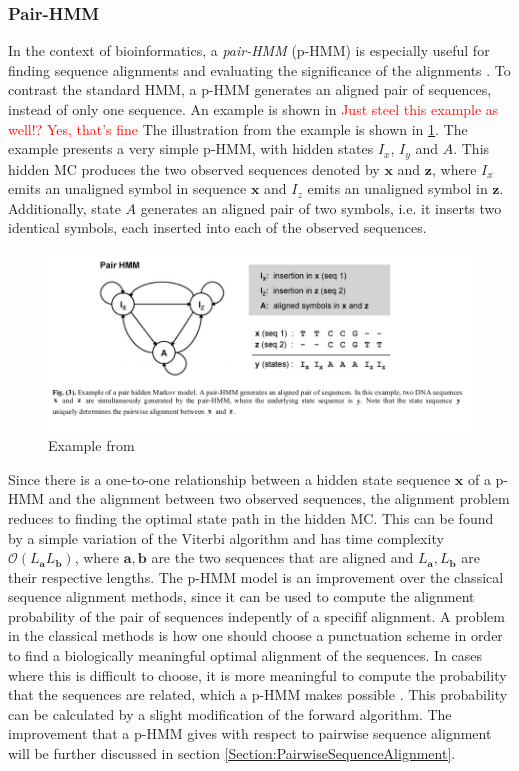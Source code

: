 \documentclass{article}\usepackage[]{graphicx}\usepackage[]{color}
\begin{document}
\subsubsection{Pair-HMM}
In the context of bioinformatics, a \textit{pair-HMM} (p-HMM) is especially useful for finding sequence alignments and evaluating the significance of the alignments \cite{Yoon2009}. To contrast the standard HMM, a p-HMM generates an aligned pair of sequences, instead of only one sequence. An example is shown in \cite{Yoon2009} \textcolor{red}{Just steel this example as well!? Yes, that's fine} The illustration from the example is shown in \ref{fig:Yoon2009PairHMMExample}. The example presents a very simple p-HMM, with hidden states $I_x$, $I_y$ and $A$. This hidden MC produces the two observed sequences denoted by $\mathbf{x}$ and $\mathbf{z}$, where $I_x$ emits an unaligned symbol in sequence $\mathbf{x}$ and $I_z$ emits an unaligned symbol in $\mathbf{z}$. Additionally, state $A$ generates an aligned pair of two symbols, i.e. it inserts two identical symbols, each inserted into each of the observed sequences.  

\begin{figure}
    \centering
    \includegraphics[width = \textwidth]{examplePairHMMYoon.png}
    \caption{Example from \cite{Yoon2009}}
    \label{fig:Yoon2009PairHMMExample}
\end{figure}

Since there is a one-to-one relationship between a hidden state sequence $\mathbf{x}$ of a p-HMM and the alignment between two observed sequences, the alignment problem reduces to finding the optimal state path in the hidden MC. This can be found by a simple variation of the Viterbi algorithm and has time complexity $\mathcal{O}(L_\mathbf{a}L_\mathbf{b})$, where $\mathbf{a}, \mathbf{b}$ are the two sequences that are aligned and $L_\mathbf{a}, L_\mathbf{b}$ are their respective lengths. The p-HMM model is an improvement over the classical sequence alignment methods, since it can be used to compute the alignment probability of the pair of sequences indepently of a specifif alignment. A problem in the classical methods is how one should choose a punctuation scheme in order to find a biologically meaningful optimal alignment of the sequences. In cases where this is difficult to choose, it is more meaningful to compute the probability that the sequences are related, which a p-HMM makes possible \cite{Yoon2009}. This probability can be calculated by a slight modification of the forward algorithm. The improvement that a p-HMM gives with respect to pairwise sequence alignment will be further discussed in section \ref{Section:PairwiseSequenceAlignment}.
\end{document}
